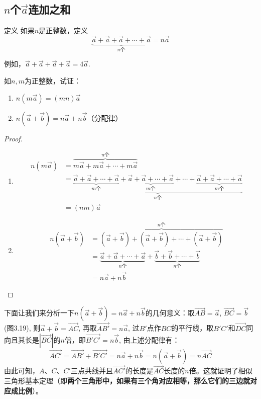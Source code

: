 \subsection{$n$个$\vec{a}$连加之和}

\begin{blk}{定义}
如果$n$是正整数，定义
\[\underbrace{\vec{a}+\vec{a}+\vec{a}+\cdots+\vec{a}}_{\text{$n$个}}=n\vec{a}\] 
\end{blk}

例如，$\vec{a}+\vec{a}+\vec{a}+\vec{a}=4\vec{a}$.

\begin{example}
如$n,m$为正整数，试证：
\begin{enumerate}
    \item $n\left(m\vec{a}\right)=(mn)\vec{a}$
    \item $n\left(\vec{a}+\vec{b}\right)=n\vec{a}+n\vec{b}$（分配律）
\end{enumerate}
\end{example}   

\begin{proof}
\begin{enumerate}
    \item 
\[\begin{split}
     n\left(m\vec{a}\right)&=\overbrace{m\vec{a}+m\vec{a}+\cdots +m\vec{a}}^{n\text{个}}\\
&=\underbrace{\underbrace{\vec{a}+\vec{a}+\cdots+\vec{a}}_{m\text{个}}+\underbrace{\vec{a}+\vec{a}+\cdots+\vec{a}}_{m\text{个}}+\cdots +\underbrace{\vec{a}+\vec{a}+\cdots+\vec{a}}_{m\text{个}}}_{n\text{个}}\\
&=(nm)\vec{a} 
\end{split}\]
\item 
\[\begin{split}
     n\left(\vec{a}+\vec{b}\right)&=\overbrace{\left(\vec{a}+\vec{b}\right)+\left(\vec{a}+\vec{b}\right)+\cdots +\left(\vec{a}+\vec{b}\right)}^{n\text{个}}\\
   &=  \underbrace{\vec{a}+\vec{a}+\cdots+\vec{a}}_{n\text{个}}+\underbrace{\vec{b}+\vec{b}+\cdots+\vec{b}}_{n\text{个}}\\
     &=n\vec{a}+n\vec{b}
\end{split}\]
\end{enumerate}    
\end{proof}

下面让我们来分析一下$n\left(\vec{a}+\vec{b}\right)=n\vec{a}+n\vec{b}$的几何意义：取$\Vec{AB}=\vec{a}$, $\Vec{BC}=\vec{b}$ (图3.19), 则$\vec{a}+\vec{b}=\Vec{AC}$, 再取$\Vec{AB'}=n\vec{a}$, 过$B'$点作$BC$的平行线，取$B'C'$和$\Vec{DC}$同向且其长是$|\Vec{BC}|$的$n$倍，即$\Vec{B'C'}=n\vec{b}$, 由上述分配律有：
\[\Vec{AC'}=\Vec{AB'}+\Vec{B'C'}=n\vec{a}+n\vec{b}=n\left(\vec{a}+\vec{b}\right)=n\Vec{AC}\]
由此可知，$A$、$C$、$C'$三点共线并且$\Vec{AC'}$的长度是$\Vec{AC}$长度的$n$倍。这就证明了相似三角形基本定理（即\textbf{两个三角形中，如果有三个角对应相等，那么它们的三边就对应成比例}）。

